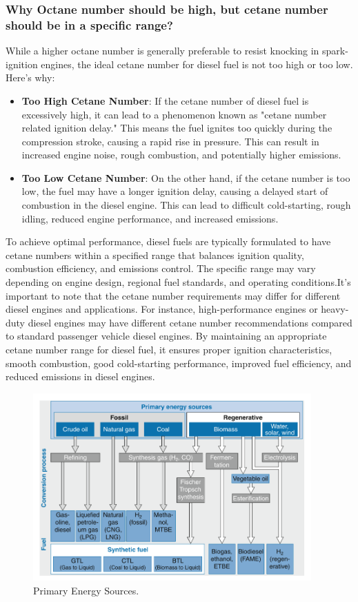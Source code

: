\documentclass{article}
\begin{document}
\subsubsection*{Why Octane number should be high, but cetane number should be in a specific range?}
While a higher octane number is generally preferable to resist knocking in spark-ignition engines, the ideal cetane number for diesel fuel is not too high or too low. Here's why:
\begin{itemize}
  \item \textbf{Too High Cetane Number}: If the cetane number of diesel fuel is excessively high, it can lead to a phenomenon known as "cetane number related ignition delay." This means the fuel ignites too quickly during the compression stroke, causing a rapid rise in pressure. This can result in increased engine noise, rough combustion, and potentially higher emissions.
  \item \textbf{Too Low Cetane Number}: On the other hand, if the cetane number is too low, the fuel may have a longer ignition delay, causing a delayed start of combustion in the diesel engine. This can lead to difficult cold-starting, rough idling, reduced engine performance, and increased emissions.
\end{itemize}

To achieve optimal performance, diesel fuels are typically formulated to have cetane numbers within a specified range that balances ignition quality, combustion efficiency, and emissions control. The specific range may vary depending on engine design, regional fuel standards, and operating conditions.It's important to note that the cetane number requirements may differ for different diesel engines and applications. For instance, high-performance engines or heavy-duty diesel engines may have different cetane number recommendations compared to standard passenger vehicle diesel engines. By maintaining an appropriate cetane number range for diesel fuel, it ensures proper ignition characteristics, smooth combustion, good cold-starting performance, improved fuel efficiency, and reduced emissions in diesel engines.

\begin{figure}
  \centering
  \includegraphics[width=0.95\textwidth]{img/energy.png}
  \caption{Primary Energy Sources.}
  \label{fig:Primary Energy Sources }
\end{figure}
\end{document}
